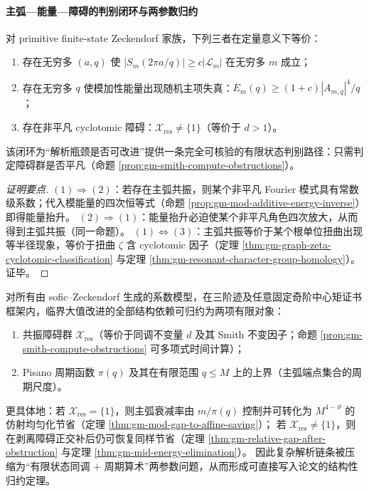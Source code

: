 \paragraph{主弧—能量—障碍的判别闭环与两参数归约}
\begin{theorem}\label{thm:gm-majorarc-energy-obstruction-loop}
对 primitive finite-state Zeckendorf 家族，下列三者在定量意义下等价：
\begin{enumerate}
  \item 存在无穷多 \((a,q)\) 使 \(|S_m(2\pi a/q)|\ge c|\mathcal{L}_m|\) 在无穷多 \(m\) 成立；
  \item 存在无穷多 \(q\) 使模加性能量出现随机主项失真：\(E_m(q)\ge (1+c)|A_{m,q}|^4/q\)；
  \item 存在非平凡 cyclotomic 障碍：\(\mathcal{X}_{\mathrm{res}}\neq\{1\}\)（等价于 \(d>1\)）。
\end{enumerate}
该闭环为“解析瓶颈是否可改进”提供一条完全可核验的有限状态判别路径：只需判定障碍群是否平凡（命题 \ref{prop:gm-smith-compute-obstructions}）。
\end{theorem}

\begin{proof}[证明要点]
\((1)\Rightarrow(2)\)：若存在主弧共振，则某个非平凡 Fourier 模式具有常数级系数；代入模能量的四次恒等式（命题 \ref{prop:gm-mod-additive-energy-inverse}）即得能量抬升。
\((2)\Rightarrow(1)\)：能量抬升必迫使某个非平凡角色四次放大，从而得到主弧共振（同一命题）。
\((1)\Leftrightarrow(3)\)：主弧共振等价于某个根单位扭曲出现等半径现象，等价于扭曲 \(\zeta\) 含 cyclotomic 因子（定理 \ref{thm:gm-graph-zeta-cyclotomic-classification} 与定理 \ref{thm:gm-resonant-character-group-homology}）。证毕。
\end{proof}

\begin{theorem}\label{thm:gm-two-finite-objects-outline}
对所有由 sofic--Zeckendorf 生成的系数模型，在三阶迹及任意固定奇阶中心矩证书框架内，临界大值改进的全部结构依赖可归约为两项有限对象：
\begin{enumerate}
  \item 共振障碍群 \(\mathcal{X}_{\mathrm{res}}\)（等价于同调不变量 \(d\) 及其 Smith 不变因子；命题 \ref{prop:gm-smith-compute-obstructions} 可多项式时间计算）；
  \item Pisano 周期函数 \(\pi(q)\) 及其在有限范围 \(q\le M\) 上的上界（主弧端点集合的周期尺度）。
\end{enumerate}
更具体地：若 \(\mathcal{X}_{\mathrm{res}}=\{1\}\)，则主弧衰减率由 \(m/\pi(q)\) 控制并可转化为 \(M^{4-\vartheta}\) 的仿射均匀化节省（定理 \ref{thm:gm-mod-gap-to-affine-saving}）；
若 \(\mathcal{X}_{\mathrm{res}}\neq\{1\}\)，则在剥离障碍正交补后仍可恢复同样节省（定理 \ref{thm:gm-relative-gap-after-obstruction} 与定理 \ref{thm:gm-mid-energy-elimination}）。
因此复杂解析链条被压缩为“有限状态同调 \(+\) 周期算术”两参数问题，从而形成可直接写入论文的结构性归约定理。
\end{theorem}

\endinput
